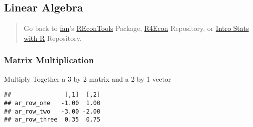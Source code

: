 \documentclass[
]{book}
\newenvironment{Shaded}{\begin{snugshade}}{\end{snugshade}}
\newcommand{\CommentTok}[1]{\textcolor[rgb]{0.56,0.35,0.01}{\textit{#1}}}
\newcommand{\DecValTok}[1]{\textcolor[rgb]{0.00,0.00,0.81}{#1}}
\newcommand{\FloatTok}[1]{\textcolor[rgb]{0.00,0.00,0.81}{#1}}
\newcommand{\KeywordTok}[1]{\textcolor[rgb]{0.13,0.29,0.53}{\textbf{#1}}}
\newcommand{\NormalTok}[1]{#1}
\newcommand{\OperatorTok}[1]{\textcolor[rgb]{0.81,0.36,0.00}{\textbf{#1}}}
\newcommand{\StringTok}[1]{\textcolor[rgb]{0.31,0.60,0.02}{#1}}
\begin{document}
\hypertarget{linear-algebra}{%
\subsection{Linear Algebra}\label{linear-algebra}}

\begin{quote}
Go back to \href{http://fanwangecon.github.io/CodeDynaAsset/}{fan}'s \href{https://fanwangecon.github.io/REconTools/}{REconTools} Package, \href{https://fanwangecon.github.io/R4Econ/}{R4Econ} Repository, or \href{https://fanwangecon.github.io/Stat4Econ/}{Intro Stats with R} Repository.
\end{quote}

\hypertarget{matrix-multiplication}{%
\subsubsection{Matrix Multiplication}\label{matrix-multiplication}}

Multiply Together a 3 by 2 matrix and a 2 by 1 vector

\begin{Shaded}
\end{Shaded}

\begin{verbatim}
##               [,1]  [,2]
## ar_row_one   -1.00  1.00
## ar_row_two   -3.00 -2.00
## ar_row_three  0.35  0.75
\end{verbatim}
\end{document}
